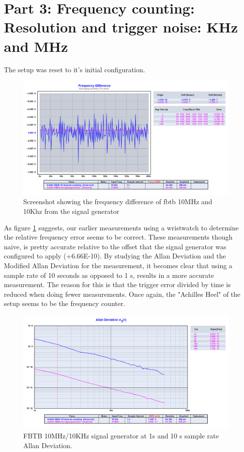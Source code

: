 \documentclass[11pt,english,a4paper]{article}
\begin{document}
\newpage
\section{Part 3: Frequency counting: Resolution and trigger noise: KHz and MHz}
The setup was reset to it's initial configuration. 
\begin{figure}[!htb]
  \centering
    \includegraphics[width=1\textwidth]{freq_diff_del3.png}
   \caption{Screenshot showing the frequency difference of fbtb 10MHz and 10Khz from the signal generator}
  \label{fig:freq_diff_3}
\end{figure}
As figure \ref{fig:freq_diff_3} suggests, our earlier measurements using a wristwatch to determine the relative frequency error seems to be correct. These measurements though naive, is pretty accurate relative to the offset that the signal generator was configured to apply (+6.66E-10). By studying the Allan Deviation and the Modified Allan Deviation for the measurement, it becomes clear that using a sample rate of 10 seconds as opposed to 1 s, results in a more accurate measurement. The reason for this is that the trigger error divided by time is reduced when doing fewer measurements. Once again, the "Achilles Heel" of the setup seems to be the frequency counter. 

\begin{figure}[!htb]
  \centering
    \includegraphics[width=1\textwidth]{fbtb_10mhzkhz_generator_allan.png}
    \caption{FBTB 10MHz/10KHz signal generator at 1s and 10 s sample rate Allan Deviation.}
        \label{fig:sg_10x_allan_dev}
\end{figure}
\end{document}
